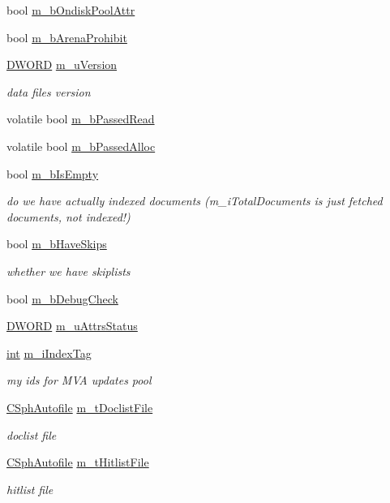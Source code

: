 \begin{DoxyCompactItemize}
\item 
bool \hyperlink{classCSphIndex__VLN_a12ec73b6de3eb3d8d0d3353a3391be46}{m\-\_\-b\-Ondisk\-Pool\-Attr}
\item 
bool \hyperlink{classCSphIndex__VLN_ae421f7393f6b6010ea5a50b3a7ae7518}{m\-\_\-b\-Arena\-Prohibit}
\item 
\hyperlink{sphinxstd_8h_a798af1e30bc65f319c1a246cecf59e39}{D\-W\-O\-R\-D} \hyperlink{classCSphIndex__VLN_ad0f2135353d82298028168bfb907d56d}{m\-\_\-u\-Version}
\begin{DoxyCompactList}\small\item\em data files version \end{DoxyCompactList}\item 
volatile bool \hyperlink{classCSphIndex__VLN_aef7d2489dccd2bd576c064f14611b426}{m\-\_\-b\-Passed\-Read}
\item 
volatile bool \hyperlink{classCSphIndex__VLN_af4b0c18218a61ebd4195d373967426f3}{m\-\_\-b\-Passed\-Alloc}
\item 
bool \hyperlink{classCSphIndex__VLN_aee6349cca972ae11c1e8aca95a7e95e9}{m\-\_\-b\-Is\-Empty}
\begin{DoxyCompactList}\small\item\em do we have actually indexed documents (m\-\_\-i\-Total\-Documents is just fetched documents, not indexed!) \end{DoxyCompactList}\item 
bool \hyperlink{classCSphIndex__VLN_a91098fede5b42d8991979ccd7ef00e21}{m\-\_\-b\-Have\-Skips}
\begin{DoxyCompactList}\small\item\em whether we have skiplists \end{DoxyCompactList}\item 
bool \hyperlink{classCSphIndex__VLN_a5cbf8ccbb123d90bb48a2d6c750ef98f}{m\-\_\-b\-Debug\-Check}
\item 
\hyperlink{sphinxstd_8h_a798af1e30bc65f319c1a246cecf59e39}{D\-W\-O\-R\-D} \hyperlink{classCSphIndex__VLN_a391dbb57434b6eee37e1bd7c61f9e5c9}{m\-\_\-u\-Attrs\-Status}
\item 
\hyperlink{sphinxexpr_8cpp_a4a26e8f9cb8b736e0c4cbf4d16de985e}{int} \hyperlink{classCSphIndex__VLN_aca1f6d99738c9f0d8fd70c23d2ee325f}{m\-\_\-i\-Index\-Tag}
\begin{DoxyCompactList}\small\item\em my ids for M\-V\-A updates pool \end{DoxyCompactList}\item 
\hyperlink{classCSphAutofile}{C\-Sph\-Autofile} \hyperlink{classCSphIndex__VLN_a0cb2e9d10215ca5c7f248be4f3816ec7}{m\-\_\-t\-Doclist\-File}
\begin{DoxyCompactList}\small\item\em doclist file \end{DoxyCompactList}\item 
\hyperlink{classCSphAutofile}{C\-Sph\-Autofile} \hyperlink{classCSphIndex__VLN_aa046c0e0bcaf89a4087f2b1819a0c71a}{m\-\_\-t\-Hitlist\-File}
\begin{DoxyCompactList}\small\item\em hitlist file \end{DoxyCompactList}\end{DoxyCompactItemize}
